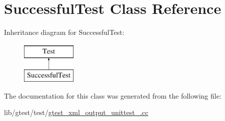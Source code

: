 \hypertarget{class_successful_test}{\section{Successful\-Test Class Reference}
\label{class_successful_test}
}
Inheritance diagram for Successful\-Test\-:\begin{figure}[H]
\begin{center}
\leavevmode
\includegraphics[height=2.000000cm]{class_successful_test}
\end{center}
\end{figure}


The documentation for this class was generated from the following file\-:\begin{DoxyCompactItemize}
\item 
lib/gtest/test/\hyperlink{gtest__xml__output__unittest___8cc}{gtest\-\_\-xml\-\_\-output\-\_\-unittest\-\_\-.\-cc}\end{DoxyCompactItemize}
